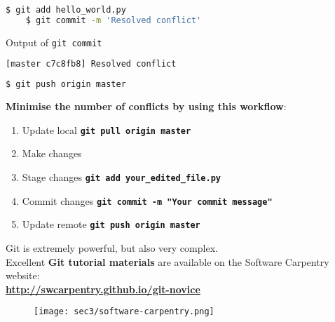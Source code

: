 \begin{frame}[fragile]
\emptyframetitle

  \begin{lstlisting}[language=bash]
    $ git add hello_world.py 
    $ git commit -m 'Resolved conflict'
  \end{lstlisting}

  \vspace*{-0.25cm}
  \begin{block}{Output of \texttt{git commit}}
  \vspace*{-0.25cm}
    \begin{lstlisting}[language=bash]
      [master c7c8fb8] Resolved conflict
    \end{lstlisting}
  \end{block}
 
  \vspace*{-0.25cm}
  \begin{lstlisting}[language=bash]
    $ git push origin master 
  \end{lstlisting}

  \vspace*{0.25cm}

  \textbf{Minimise the number of conflicts by using this workflow}:

  \begin{enumerate}
    \item Update local \hspace*{0.25cm} \texttt{\textbf{git pull origin master}}
    \item Make changes	
    \item Stage changes \hspace*{0.25cm} \texttt{\textbf{git add your\_edited\_file.py}}
    \item Commit changes \hspace*{0.25cm} \texttt{\textbf{git commit -m "Your commit message"}}
    \item Update remote \hspace*{0.25cm} \texttt{\textbf{git push origin master}}
  \end{enumerate}

\end{frame}

\begin{frame}[fragile]
\emptyframetitle

  Git is extremely powerful, but also very complex.\\[0.5cm]

  Excellent \textbf{Git tutorial materials} are available on the Software Carpentry website:\\[0.5cm]
  \textbf{\url{http://swcarpentry.github.io/git-novice}}\\[0.5cm]

  \begin{figure}[h]
    \texttt{[image: sec3/software-carpentry.png]}
  \end{figure}


\end{frame}

